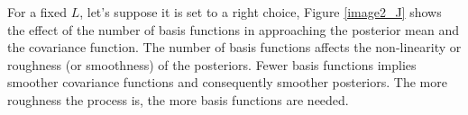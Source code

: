 \documentclass[]{interact}
\theoremstyle{plain}%
\theoremstyle{definition}
\theoremstyle{remark}
\begin{document}
For a fixed $L$, let's suppose it is set to a right choice, Figure \ref{image2_J} shows the effect of the number of basis functions in approaching the posterior mean and the covariance function. The number of basis functions affects the non-linearity or roughness (or smoothness) of the posteriors. Fewer basis functions implies smoother covariance functions and consequently smoother posteriors. The more roughness the process is, the more basis functions are needed. 

\begin{figure}[H]
\centering
{}

\end{figure}
\end{document}
